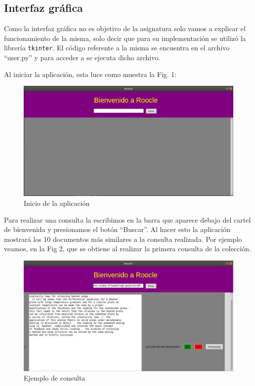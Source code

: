 \documentclass[runningheads]{llncs}
\begin{document}
	\subsection{Interfaz gr\'afica}
	
	Como la interfaz gr\'afica no es objetivo de la asignatura solo vamos a explicar el funcionamiento de la misma, solo decir que para su implementaci\'on se utiliz\'o la librer\'ia \verb|tkinter|. El c\'odigo referente a la misma se encuentra en el archivo ``user.py'' y para acceder a se ejecuta dicho archivo.
	
	Al iniciar la aplicaci\'on, esta luce como muestra la Fig. 1:
	
	\begin{figure}[h]
		\begin{center}
			\includegraphics[width =12.0cm]{inicio.png}
			\caption[Fig1]{Inicio de la aplicaci\'on}		
		\end{center}
	\end{figure}
	
	Para realizar una consulta la escribimos en la barra que aparece debajo del cartel de bienvenida y presionamos el bot\'on ``Buscar''. Al hacer esto la aplicaci\'on mostrar\'a los 10 documentos m\'as similares a la consulta realizada. Por ejemplo veamos, en la Fig 2, que se obtiene al realizar la primera consulta de la colecci\'on.
	
	\begin{figure}[h]
		\begin{center}
			\includegraphics[width =12.0cm]{consulta.png}	
			\caption[Fig2]{Ejemplo de consulta}	
		\end{center}
	\end{figure}
	
\end{document}
